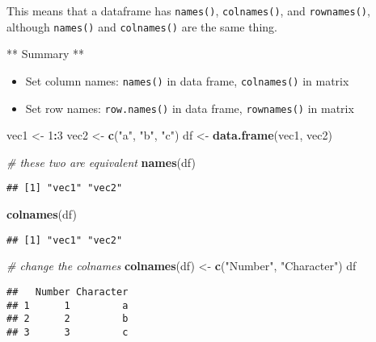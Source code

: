 \documentclass[
]{book}
\newenvironment{Shaded}{\begin{snugshade}}{\end{snugshade}}
\newcommand{\CommentTok}[1]{\textcolor[rgb]{0.56,0.35,0.01}{\textit{#1}}}
\newcommand{\DecValTok}[1]{\textcolor[rgb]{0.00,0.00,0.81}{#1}}
\newcommand{\KeywordTok}[1]{\textcolor[rgb]{0.13,0.29,0.53}{\textbf{#1}}}
\newcommand{\NormalTok}[1]{#1}
\newcommand{\OperatorTok}[1]{\textcolor[rgb]{0.81,0.36,0.00}{\textbf{#1}}}
\newcommand{\StringTok}[1]{\textcolor[rgb]{0.31,0.60,0.02}{#1}}
\providecommand{\tightlist}{%
  \setlength{\itemsep}{0pt}\setlength{\parskip}{0pt}}
\begin{document}
This means that a dataframe has \texttt{names()}, \texttt{colnames()}, and \texttt{rownames()}, although \texttt{names()} and \texttt{colnames()} are the same thing.

** Summary **

\begin{itemize}
\tightlist
\item
  Set column names: \texttt{names()} in data frame, \texttt{colnames()} in matrix
\item
  Set row names: \texttt{row.names()} in data frame, \texttt{rownames()} in matrix
\end{itemize}

\begin{Shaded}
\begin{Highlighting}[]
\NormalTok{vec1 \textless{}{-}}\StringTok{ }\DecValTok{1}\OperatorTok{:}\DecValTok{3}
\NormalTok{vec2 \textless{}{-}}\StringTok{ }\KeywordTok{c}\NormalTok{(}\StringTok{"a"}\NormalTok{, }\StringTok{"b"}\NormalTok{, }\StringTok{"c"}\NormalTok{)}
\NormalTok{df \textless{}{-}}\StringTok{ }\KeywordTok{data.frame}\NormalTok{(vec1, vec2)}

\CommentTok{\# these two are equivalent}
\KeywordTok{names}\NormalTok{(df)}
\end{Highlighting}
\end{Shaded}

\begin{verbatim}
## [1] "vec1" "vec2"
\end{verbatim}

\begin{Shaded}
\begin{Highlighting}[]
\KeywordTok{colnames}\NormalTok{(df)}
\end{Highlighting}
\end{Shaded}

\begin{verbatim}
## [1] "vec1" "vec2"
\end{verbatim}

\begin{Shaded}
\begin{Highlighting}[]
\CommentTok{\# change the colnames}
\KeywordTok{colnames}\NormalTok{(df) \textless{}{-}}\StringTok{ }\KeywordTok{c}\NormalTok{(}\StringTok{"Number"}\NormalTok{, }\StringTok{"Character"}\NormalTok{)}
\NormalTok{df}
\end{Highlighting}
\end{Shaded}

\begin{verbatim}
##   Number Character
## 1      1         a
## 2      2         b
## 3      3         c
\end{verbatim}
\end{document}
